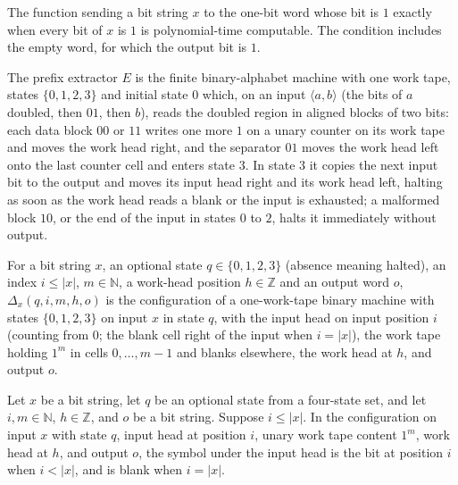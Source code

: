 \begin{lemma}
\label{Complexity.tmsat_pt_unary}
\leanok
{}
The function sending a bit string $x$ to the one-bit word whose bit is $1$ exactly when
every bit of $x$ is $1$ is polynomial-time computable. The condition includes the empty
word, for which the output bit is $1$.
\end{lemma}

\begin{definition}
\label{Complexity.tmsatTakeTM}
\leanok
{}
The prefix extractor $E$ is the finite binary-alphabet machine with one work tape, states $\{0,1,2,3\}$ and initial state $0$ which, on an input $\langle a,b\rangle$ (the bits of $a$ doubled, then $01$, then $b$), reads the doubled region in aligned blocks of two bits: each data block $00$ or $11$ writes one more $1$ on a unary counter on its work tape and moves the work head right, and the separator $01$ moves the work head left onto the last counter cell and enters state $3$. In state $3$ it copies the next input bit to the output and moves its input head right and its work head left, halting as soon as the work head reads a blank or the input is exhausted; a malformed block $10$, or the end of the input in states $0$ to $2$, halts it immediately without output.
\end{definition}

\begin{definition}
\label{Complexity.tmsatTakeCfg}
\leanok
{}
For a bit string $x$, an optional state $q \in \{0,1,2,3\}$ (absence meaning halted), an index $i \le |x|$, $m \in \mathbb{N}$, a work-head position $h \in \mathbb{Z}$ and an output word $o$, $\Delta_x(q,i,m,h,o)$ is the configuration of a one-work-tape binary machine with states $\{0,1,2,3\}$ on input $x$ in state $q$, with the input head on input position $i$ (counting from $0$; the blank cell right of the input when $i = |x|$), the work tape holding $1^m$ in cells $0,\dots,m-1$ and blanks elsewhere, the work head at $h$, and output $o$.
\end{definition}

\begin{lemma}
\label{Complexity.tmsat_take_read}
\leanok
{}
Let $x$ be a bit string, let $q$ be an optional state from a four-state set, and let
$i,m\in\mathbb N$, $h\in\mathbb Z$, and $o$ be a bit string. Suppose $i\le |x|$. In the
configuration on input $x$ with state $q$, input head at position $i$, unary work tape
content $1^m$, work head at $h$, and output $o$, the symbol under the input head is the
bit at position $i$ when $i<|x|$, and is blank when $i=|x|$.
\end{lemma}

